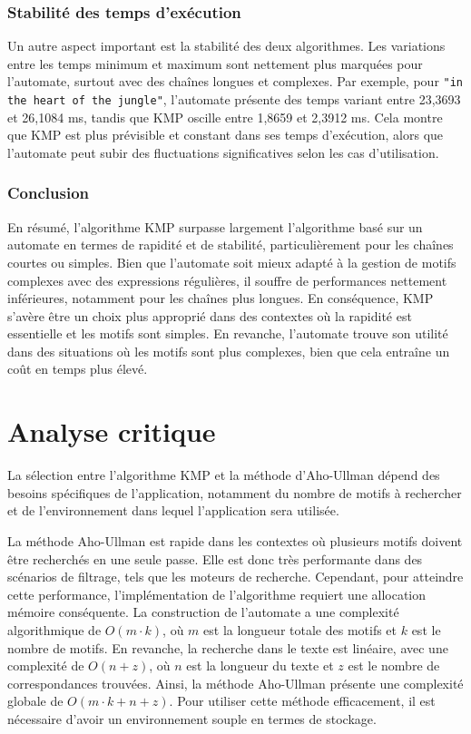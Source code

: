\documentclass{article}
\begin{document}
\subsubsection*{Stabilité des temps d'exécution}
Un autre aspect important est la stabilité des deux algorithmes. Les variations entre les temps minimum et maximum sont nettement plus marquées pour l'automate, surtout avec des chaînes longues et complexes. Par exemple, pour \texttt{"in the heart of the jungle"}, l'automate présente des temps variant entre 23,3693 et 26,1084 ms, tandis que KMP oscille entre 1,8659 et 2,3912 ms. Cela montre que KMP est plus prévisible et constant dans ses temps d'exécution, alors que l'automate peut subir des fluctuations significatives selon les cas d'utilisation.

\subsubsection{Conclusion}
En résumé, l'algorithme KMP surpasse largement l'algorithme basé sur un automate en termes de rapidité et de stabilité, particulièrement pour les chaînes courtes ou simples. Bien que l'automate soit mieux adapté à la gestion de motifs complexes avec des expressions régulières, il souffre de performances nettement inférieures, notamment pour les chaînes plus longues. En conséquence, KMP s'avère être un choix plus approprié dans des contextes où la rapidité est essentielle et les motifs sont simples. En revanche, l'automate trouve son utilité dans des situations où les motifs sont plus complexes, bien que cela entraîne un coût en temps plus élevé.


\newpage
\section{Analyse critique}
La sélection entre l'algorithme KMP et la méthode d’Aho-Ullman dépend des besoins spécifiques de l’application, notamment du nombre de motifs à rechercher et de l’environnement dans lequel l’application sera utilisée.

La méthode Aho-Ullman est rapide dans les contextes où plusieurs motifs doivent être recherchés en une seule passe. Elle est donc très performante dans des scénarios de filtrage, tels que les moteurs de recherche. Cependant, pour atteindre cette performance, l’implémentation de l’algorithme requiert une allocation mémoire conséquente. La construction de l’automate a une complexité algorithmique de \( O(m \cdot k) \), où \( m \) est la longueur totale des motifs et \( k \) est le nombre de motifs. En revanche, la recherche dans le texte est linéaire, avec une complexité de \( O(n + z) \), où \( n \) est la longueur du texte et \( z \) est le nombre de correspondances trouvées. Ainsi, la méthode Aho-Ullman présente une complexité globale de \( O(m \cdot k + n + z) \). Pour utiliser cette méthode efficacement, il est nécessaire d’avoir un environnement souple en termes de stockage.
\end{document}
